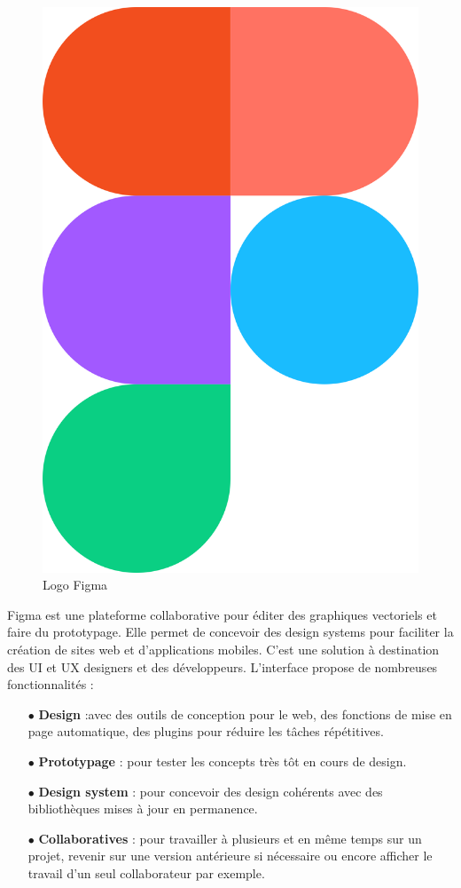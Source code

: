 \begin{figure}[H]
    \centering
    \includegraphics[scale=0.05]{Logos/Figma.png}
    \caption{Logo Figma}
\end{figure} 

Figma est une plateforme collaborative pour éditer des graphiques vectoriels et faire du prototypage. Elle permet de concevoir des design systems pour faciliter la création de sites web et d’applications mobiles. C’est une solution à destination des UI et UX designers et des développeurs. L’interface propose de nombreuses fonctionnalités :

\begin{itemize}
    \item[$\bullet$] \textbf{Design} :avec des outils de conception pour le web, des fonctions de mise en page automatique, des plugins pour réduire les tâches répétitives.
    \item[$\bullet$] \textbf{Prototypage} : pour tester les concepts très tôt en cours de design.
    \item[$\bullet$] \textbf{Design system} : pour concevoir des design cohérents avec des bibliothèques mises à jour en permanence.
    \item[$\bullet$] \textbf{Collaboratives} : pour travailler à plusieurs et en même temps sur un projet, revenir sur une version antérieure si nécessaire ou encore afficher le travail d’un seul collaborateur par exemple.
\end{itemize}

